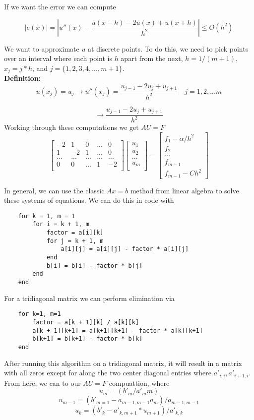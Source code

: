\documentclass[10pt]{article}
\begin{document}
If we want the error we can compute

\[|e(x)| = |u''(x) - \frac{u(x-h) -2u(x) + u(x+h)}{h^2} | \leq O(h^2)\]

We want to approximate $u$ at discrete points. To do this, we need to pick points over an interval where each point is $h$ apart from the next, $h = 1/(m + 1)$, $x_j = j*h$, and $j = \{1,2,3,4,...,m+1\}$.\\

\textbf{Definition:}
\[u(x_j) = u_j \rightarrow u''(x_j) = \frac{u_{j-1} - 2u_j + u_{j+1}}{h^2} \quad j = 1,2,...m\]

\[\rightarrow \frac{u_{j-1} - 2u_j + u_{j + 1}}{h^2}\]
Working through these computations we get $A U = F$
$$
\begin{bmatrix}
    -2 & 1 & 0 & ... & 0\\
    1 & -2 & 1 & ... & 0\\
    ... & ... & ... & ... & ...\\
    0 & 0 & ... & 1 & -2\\ 
\end{bmatrix}
\begin{bmatrix}
    u_1\\
    u_2\\
    ...\\
    u_m\\
\end{bmatrix}
= 
\begin{bmatrix}
    f_1 - \alpha/h^2\\
    f_2\\
    ...\\
    f_{m-1}\\
    f_{m-1} - Ch^2
\end{bmatrix}
$$

In general, we can use the classic $Ax = b$ method from linear algebra to solve these systems of equations. We can do this in code with
\begin{verbatim}
    for k = 1, m = 1
        for i = k + 1, m
            factor = a[i][k] 
            for j = k + 1, m
                a[i][j] = a[i][j] - factor * a[i][j]
            end
            b[i] = b[i] - factor * b[j]
        end
    end
\end{verbatim}

For a tridiagonal matrix we can perform elimination via
\begin{verbatim}
    for k=1, m=1
        factor = a[k + 1][k] / a[k][k]
        a[k + 1][k+1] = a[k+1][k+1] - factor * a[k][k+1]
        b[k+1] = b[k+1] - factor * b[k]
    end
\end{verbatim}
\newpage
After running this algorithm on a tridiagonal matrix, it will result in a matrix with all zeros except for along the two center diagonal entries where $a'_{i, i}, a'_{i + 1, i}$. From here, we can to our $AU = F$ compuattion, where
\[u_m = (b'_m/a'_{m}{m})\]
\[u_{m-1} = (b'_{m=1} - a_{m-1, m-1} a_m)/a_{m-1, m-1}\]
\[u_k = (b'_k - a'_{k, m+1} * u_{m+1}) / a'_{k,k}\]
\end{document}
